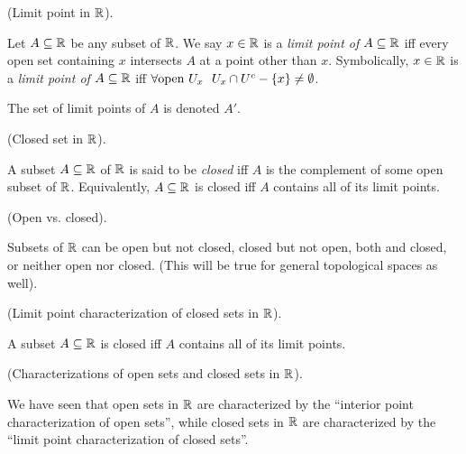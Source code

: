 \begin{defn}
    (Limit point in $\mathbb{R}$).
    
    Let $A \subseteq \mathbb{R}$ be any subset of $\mathbb{R}$. We say $x \in \mathbb{R}$ is a \textit{limit point of $A \subseteq \mathbb{R}$} iff every open set containing $x$ intersects $A$ at a point other than $x$. Symbolically, $x \in \mathbb{R}$ is a \textit{limit point of $A \subseteq \mathbb{R}$} iff  ${\forall \text{open } U_x \text{ } \text{ } U_x \cap U^c - \{x\} \neq \emptyset}$.
    
    The set of limit points of $A$ is denoted $A'$.
\end{defn}

\begin{defn}
    (Closed set in $\mathbb{R}$).
    
    A subset $A \subseteq \mathbb{R}$ of $\mathbb{R}$ is said to be \textit{closed} iff $A$ is the complement of some open subset of $\mathbb{R}$. Equivalently, $A \subseteq \mathbb{R}$ is closed iff $A$ contains all of its limit points.
\end{defn}

\begin{remark}
     (Open vs. closed).
     
     Subsets of $\mathbb{R}$ can be open but not closed, closed but not open, both and closed, or neither open nor closed. (This will be true for general topological spaces as well).
\end{remark}

\begin{theorem}
    (Limit point characterization of closed sets in $\mathbb{R}$).
    
    A subset $A \subseteq \mathbb{R}$ is closed iff $A$ contains all of its limit points.
\end{theorem}

\begin{remark}
     (Characterizations of open sets and closed sets in $\mathbb{R}$).
     
     We have seen that open sets in $\mathbb{R}$ are characterized by the ``interior point characterization of open sets'', while closed sets in $\mathbb{R}$ are characterized by the ``limit point characterization of closed sets''.
\end{remark}

     

